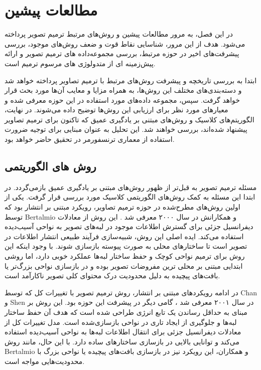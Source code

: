 
\chapter{مطالعات پیشین}

در این فصل، به مرور مطالعات پیشین و روش‌های مرتبط ترمیم تصویر پرداخته می‌شود. هدف از این مرور، شناسایی نقاط قوت و ضعف روش‌های موجود، بررسی پیشرفت‌های اخیر در حوزه مرتبط، بررسی مجموعه‌داده های ترمیم تصویر و ارائه پیش‌زمینه ای از متدولوژی های مرسوم ترمیم است.

ابتدا به بررسی تاریخچه و پیشرفت روش‌های مرتبط با ترمیم تصاویر پرداخته خواهد شد و دسته‌بندی‌های مختلف این روش‌ها، به همراه مزایا و معایب آن‌ها مورد بحث قرار خواهد گرفت. سپس، مجموعه داده‌های مورد استفاده در این حوزه معرفی شده و معیارهای مورد نظر برای ارزیابی این روش‌ها توضیح داده می‌شوند. در نهایت، الگوریتم‌های کلاسیک و روش‌های مبتنی بر یادگیری عمیق که تاکنون برای ترمیم تصاویر پیشنهاد شده‌اند، بررسی خواهند شد. این تحلیل به عنوان مبنایی برای توجیه ضرورت استفاده از معماری ترنسفورمر در تحقیق حاضر خواهد بود.

\section{روش های الگوریتمی}

مسئله ترمیم تصویر به قبل‌تر از ظهور روش‌های مبتنی بر یادگیری عمیق بازمی‌گردد. در ابتدا این مسئله به کمک روش‌های الگوریتمی کلاسیک مورد بررسی قرار گرفت. یکی از اولین روش‌های مطرح‌شده در حوزه ترمیم تصاویر، رویکرد مبتنی بر انتشار بود که توسط Bertalmio و همکارانش در سال ۲۰۰۰ معرفی شد \cite{bertalmioImageInpainting2000}. این روش از معادلات دیفرانسیل جزئی  برای گسترش اطلاعات موجود در لبه‌های تصویر به نواحی آسیب‌دیده استفاده می‌کند. ایده اصلی این روش، شبیه‌سازی فرآیند طبیعی انتشار اطلاعات در تصویر است تا ساختارهای محلی به صورت پیوسته بازسازی شوند. با وجود اینکه این روش برای ترمیم نواحی کوچک و حفظ ساختار لبه‌ها عملکرد خوبی دارد، اما روشی ابتدایی مبتنی بر محلی ترین مفروضات تصویر بوده و در بازسازی نواحی بزرگ‌تر یا بافت‌های پیچیده به دلیل محدودیت درک محتوای کلی تصویر ناکارآمد است.

در ادامه رویکردهای مبتنی بر انتشار، روش ترمیم تصویر با تغییرات کل  که توسط Chan و Shen در سال ۲۰۰۱ معرفی شد \cite{chanNontextureInpaintingCurvatureDriven2001}، گامی دیگر در پیشرفت این حوزه بود. این روش بر مبنای به حداقل رساندن یک تابع انرژی طراحی شده است که هدف آن حفظ ساختار لبه‌ها و جلوگیری از ایجاد تاری در نواحی بازسازی‌شده است. مدل تغییرات کل از معادلات دیفرانسیل جزئی برای انتقال اطلاعات لبه‌ها به نواحی آسیب‌دیده استفاده می‌کند و توانایی بالایی در بازسازی ساختارهای ساده دارد. با این حال، مانند روش Bertalmio و همکاران، این رویکرد نیز در بازسازی بافت‌های پیچیده یا نواحی بزرگ با محدودیت‌هایی مواجه است.


